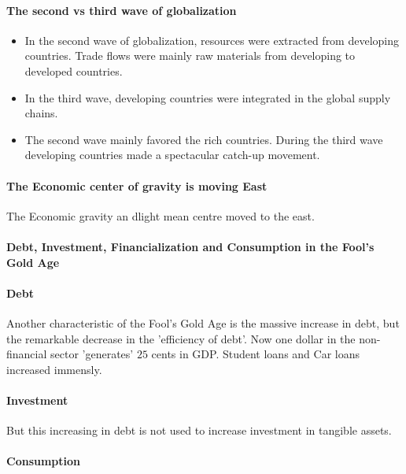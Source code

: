 \paragraph{The second vs third wave of globalization}

\begin{itemize}
    \item In the second wave of globalization, resources were extracted
        from developing countries. Trade flows were mainly raw materials
        from developing to developed countries.
    \item In the third wave, developing countries were integrated in the
        global supply chains.
    \item The second wave mainly favored the rich countries. During the
        third wave developing countries made a spectacular catch-up movement.
\end{itemize}

\paragraph{The Economic center of gravity is moving East}

The Economic gravity an dlight mean centre moved to the east.

\paragraph{Debt, Investment, Financialization and Consumption in the Fool's Gold Age}

\paragraph{Debt}

Another characteristic of the Fool's Gold Age is the massive increase
in debt, but the remarkable decrease in the 'efficiency of debt'.
Now one dollar in the non-financial sector 'generates' $25$ cents in
GDP. Student loans and Car loans increased immensly.

\paragraph{Investment}

But this increasing in debt is not used to increase investment in tangible
assets.

\paragraph{Consumption}


